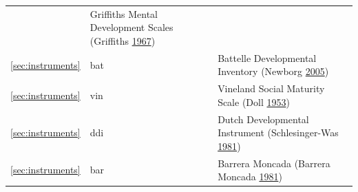 \documentclass[
]{book}
\begin{document}
\begin{longtable}[]{@{}lll@{}}
\begin{minipage}[t]{0.19\columnwidth}
\end{minipage} & \begin{minipage}[t]{0.61\columnwidth}\raggedright
Griffiths Mental Development Scales (Griffiths \protect\hyperlink{ref-griffiths1967}{1967})\strut
\end{minipage}\tabularnewline
\begin{minipage}[t]{0.12\columnwidth}\raggedright
\ref{sec:instruments}\strut
\end{minipage} & \begin{minipage}[t]{0.19\columnwidth}\raggedright
bat\strut
\end{minipage} & \begin{minipage}[t]{0.61\columnwidth}\raggedright
Battelle Developmental Inventory (Newborg \protect\hyperlink{ref-newborg2005}{2005})\strut
\end{minipage}\tabularnewline
\begin{minipage}[t]{0.12\columnwidth}\raggedright
\ref{sec:instruments}\strut
\end{minipage} & \begin{minipage}[t]{0.19\columnwidth}\raggedright
vin\strut
\end{minipage} & \begin{minipage}[t]{0.61\columnwidth}\raggedright
Vineland Social Maturity Scale (Doll \protect\hyperlink{ref-doll1953}{1953})\strut
\end{minipage}\tabularnewline
\begin{minipage}[t]{0.12\columnwidth}\raggedright
\ref{sec:instruments}\strut
\end{minipage} & \begin{minipage}[t]{0.19\columnwidth}\raggedright
ddi\strut
\end{minipage} & \begin{minipage}[t]{0.61\columnwidth}\raggedright
Dutch Developmental Instrument (Schlesinger-Was \protect\hyperlink{ref-schlesinger1981}{1981})\strut
\end{minipage}\tabularnewline
\begin{minipage}[t]{0.12\columnwidth}\raggedright
\ref{sec:instruments}\strut
\end{minipage} & \begin{minipage}[t]{0.19\columnwidth}\raggedright
bar\strut
\end{minipage} & \begin{minipage}[t]{0.61\columnwidth}\raggedright
Barrera Moncada (Barrera Moncada \protect\hyperlink{ref-barrera1981}{1981})\strut
\end{minipage}\tabularnewline

\end{longtable}
\end{document}
